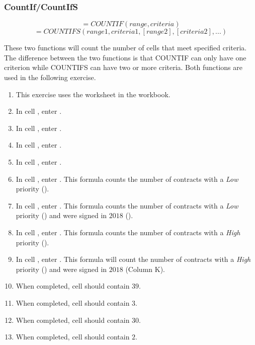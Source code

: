 \begin{enumerate}
\end{enumerate}

\subsubsection{CountIf/CountIfS}

\[ =COUNTIF(range, criteria) \]
\[ =COUNTIFS(range1, criteria1, [range2], [criteria2], ...) \]

These two functions will count the number of cells that meet specified criteria. The difference between the two functions is that COUNTIF can only have one criterion while COUNTIFS can have two or more criteria. Both functions are used in the following exercise.

\begin{enumerate}
	\item This exercise uses the  worksheet in the  workbook.
	\item In cell , enter .
	\item In cell , enter .
	\item In cell , enter .
	\item In cell , enter .
	\item In cell , enter . This formula counts the number of contracts with a \textit{Low} priority ().
	\item In cell , enter . This formula counts the number of contracts with a \textit{Low} priority () and were signed in $ 2018 $ ().
	\item In cell , enter . This formula counts the number of contracts with a \textit{High} priority ().
	\item In cell , enter . This formula will count the number of contracts with a \textit{High} priority () and were signed in $ 2018 $ (Column K).
	\item When completed, cell  should contain $ 39 $.
	\item When completed, cell  should contain $ 3 $.
	\item When completed, cell  should contain $ 30 $.
	\item When completed, cell  should contain $ 2 $.
	

\end{enumerate}
